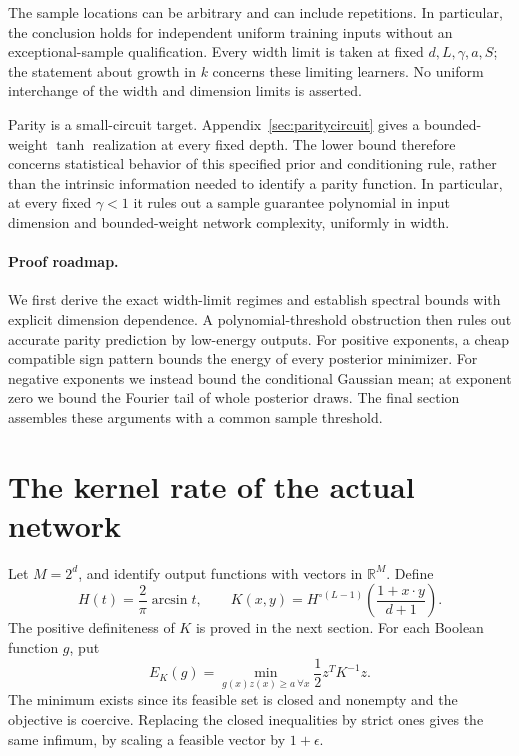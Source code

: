\documentclass[11pt]{article}
\theoremstyle{remark}\newtheorem{remark}[theorem]{Remark}
\newcommand{\R}{\mathbb R}\newcommand{\X}{\mathcal X}
\begin{document}
The sample locations can be arbitrary and can include repetitions.
In particular, the conclusion holds for independent uniform training
inputs without an exceptional-sample qualification. Every width limit
is taken at fixed $d,L,\gamma,a,S$; the statement about growth in $k$
concerns these limiting learners. No uniform interchange of the width
and dimension limits is asserted.

Parity is a small-circuit target. Appendix~\ref{sec:paritycircuit}
gives a bounded-weight $\tanh$ realization at every fixed depth. The
lower bound therefore concerns statistical behavior of this specified
prior and conditioning rule, rather than the intrinsic information
needed to identify a parity function. In particular, at every fixed
$\gamma<1$ it rules out a sample guarantee polynomial in input
dimension and bounded-weight network complexity, uniformly in width.

\paragraph{Proof roadmap.}
We first derive the exact width-limit regimes and establish spectral
bounds with explicit dimension dependence. A polynomial-threshold
obstruction then rules out accurate parity prediction by low-energy
outputs. For positive exponents, a cheap compatible sign pattern bounds
the energy of every posterior minimizer. For negative exponents we
instead bound the conditional Gaussian mean; at exponent zero we bound
the Fourier tail of whole posterior draws. The final section assembles
these arguments with a common sample threshold.

\section{The kernel rate of the actual network}
Let $M=2^d$, and identify output functions with vectors in $\R^M$.
Define
\begin{equation}\label{eq:kernel}
 H(t)=\frac2\pi\arcsin t,\qquad
 K(x,y)=H^{\circ(L-1)}\!\left(\frac{1+x\cdot y}{d+1}\right).
\end{equation}
The positive definiteness of $K$ is proved in the next section.
For each Boolean function $g$, put
\begin{equation}\label{eq:energy}
 E_K(g)=\min_{g(x)z(x)\ge a\ \forall x}\frac12 z^TK^{-1}z.
\end{equation}
The minimum exists since its feasible set is closed and nonempty and
the objective is coercive. Replacing the closed inequalities by strict
ones gives the same infimum, by scaling a feasible vector by $1+\epsilon$.
\end{document}
